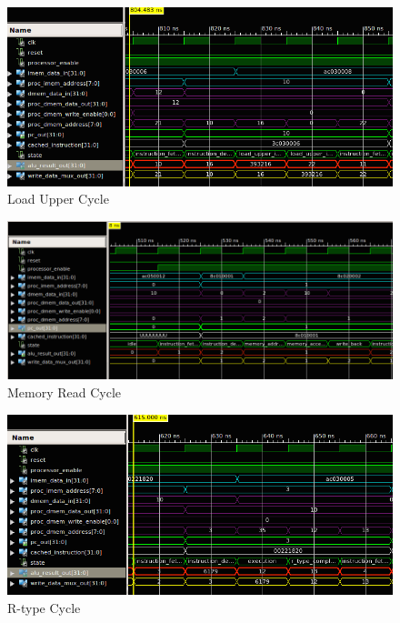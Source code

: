 \begin{figure}[ht!]
    \begin{center}
    \includegraphics[width=\textwidth]{assets/isim/load_upper_cycle.png}
    \caption{Load Upper Cycle}
    \label{fig:load_upper_cycle}
    \end{center}
\end{figure}

\begin{figure}[ht!]
    \begin{center}
    \includegraphics[width=\textwidth]{assets/isim/memory_read_cycle.png}
    \caption{Memory Read Cycle}
    \label{fig:memory_read_cycle}
    \end{center}
\end{figure}

\begin{figure}[ht!]
    \begin{center}
    \includegraphics[width=\textwidth]{assets/isim/r_type_cycle.png}
    \caption{R-type Cycle}
    \label{fig:r_type_cycle}
    \end{center}
\end{figure}
